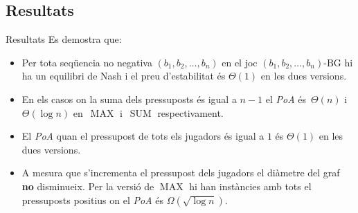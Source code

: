 \documentclass[aspectratio=169,handout]{beamer}
\DeclareMathOperator{\SUM}{SUM}
\DeclareMathOperator{\MAX}{MAX}
\begin{document}
\subsection{Resultats}
\begin{frame}{Resultats}
Es demostra que:

\begin{itemize}[<+->] 

    
    \item Per tota seqüencia no negativa $ (b_1, b_2, \dots , b_n)$ en el joc $ (b_1, b_2, \dots , b_n)\text{-BG} $ hi ha un equilibri de Nash i el preu d'estabilitat és $\Theta(1)$ en les dues versions.
    
    \vspace{1em}
    
    \item En els casos on la suma dels pressuposts és igual a $n-1$ el \emph{PoA}
    és~$\Theta(n)$ i~$\Theta(\log n)$ en~$\MAX$ i~$\SUM$ respectivament.
    
    \vspace{1em}
    
    \item El \emph{PoA} quan el pressupost de tots els jugadors és igual a $1$ és $\Theta(1)$ en les dues versions.
    
    \vspace{1em}
    
    \item A mesura que s'incrementa el pressupost dels jugadors el diàmetre del graf \textbf{no} disminueix. Per la versió de $\MAX$ hi han instàncies amb tots el pressuposts positius on el \emph{PoA} és $\Omega(\sqrt{\log n})$.
    
\end{itemize}
\end{frame}
\end{document}
